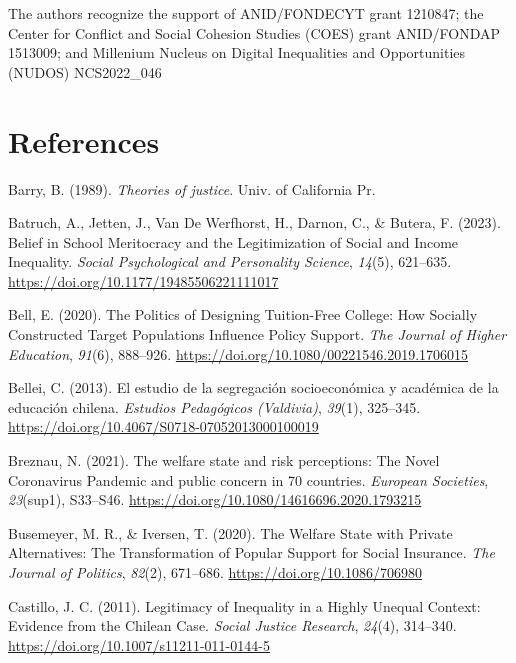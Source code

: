 \documentclass[
  12pt,
  a4paper,
]{article}
\newlength{\cslhangindent}
\newenvironment{CSLReferences}[2] %
 {%
  \setlength{\parindent}{0pt}
  \ifodd #1 \everypar{\setlength{\hangindent}{\cslhangindent}}\ignorespaces\fi
  \ifnum #2 > 0
  \setlength{\parskip}{#2\baselineskip}
  \fi
 }%
 {}
\begin{document}
The authors recognize the support of ANID/FONDECYT grant 1210847; the Center for Conflict and Social Cohesion Studies (COES) grant ANID/FONDAP 1513009; and Millenium Nucleus on Digital Inequalities and Opportunities (NUDOS) NCS2022\_046

\section{References}\label{references}

\label{refs}
\begin{CSLReferences}{1}{0}
Barry, B. (1989). \emph{Theories of justice}. Univ. of California Pr.

Batruch, A., Jetten, J., Van De Werfhorst, H., Darnon, C., \& Butera, F. (2023). Belief in {School Meritocracy} and the {Legitimization} of {Social} and {Income Inequality}. \emph{Social Psychological and Personality Science}, \emph{14}(5), 621--635. \url{https://doi.org/10.1177/19485506221111017}

Bell, E. (2020). The {Politics} of {Designing Tuition-Free College}: {How Socially Constructed Target Populations Influence Policy Support}. \emph{The Journal of Higher Education}, \emph{91}(6), 888--926. \url{https://doi.org/10.1080/00221546.2019.1706015}

Bellei, C. (2013). El estudio de la segregaci{ó}n socioecon{ó}mica y acad{é}mica de la educaci{ó}n chilena. \emph{Estudios Pedag{ó}gicos (Valdivia)}, \emph{39}(1), 325--345. \url{https://doi.org/10.4067/S0718-07052013000100019}

Breznau, N. (2021). The welfare state and risk perceptions: The {Novel Coronavirus Pandemic} and public concern in 70 countries. \emph{European Societies}, \emph{23}(sup1), S33--S46. \url{https://doi.org/10.1080/14616696.2020.1793215}

Busemeyer, M. R., \& Iversen, T. (2020). The {Welfare State} with {Private Alternatives}: {The Transformation} of {Popular Support} for {Social Insurance}. \emph{The Journal of Politics}, \emph{82}(2), 671--686. \url{https://doi.org/10.1086/706980}

Castillo, J. C. (2011). Legitimacy of {Inequality} in a {Highly Unequal Context}: {Evidence} from the {Chilean Case}. \emph{Social Justice Research}, \emph{24}(4), 314--340. \url{https://doi.org/10.1007/s11211-011-0144-5}


\end{CSLReferences}
\end{document}
